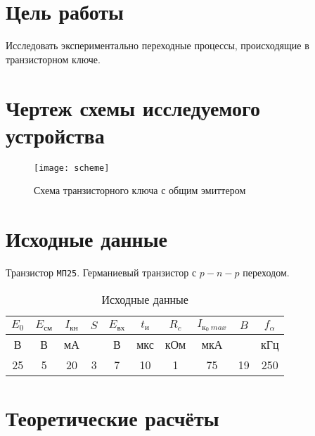 





\section{Цель работы}

Исследовать экспериментально переходные процессы, происходящие в транзисторном ключе.

\section{Чертеж схемы исследуемого устройства}

\begin{figure}[H]
\begin{center}
	\vspace{-0.5cm}
	\texttt{[image: scheme]}
	\caption{Схема транзисторного ключа с общим эмиттером}
	\vspace{-0.5cm}
\end{center}
\end{figure}

\section{Исходные данные}

Транзистор \verb+МП25+. Германиевый транзистор с $p-n-p$ переходом.

\begin{table}[H]
\begin{center}
	\caption{Исходные данные}
	\def\tabcolsep{12pt}
	\begin{tabular}{|c|c|c|c|c|c|c|c|c|c|}
		\hline
		$E_0$ &
		$E_\text{см}$ &
		$I_\text{кн}$ &
		$S$ &
		$E_\text{вх}$ &
		$t_\text{и}$ &
		$R_c$ &
		$I_{\text{к}_0\ max}$ &
		$B$ &
		$f_\alpha$ \\
		\hline
		В &
		В &
		мА &
		 &
		В &
		мкс &
		кОм &
		мкА &
		 &
		кГц \\
		\hline
		25 &
		5 &
		20 &
		3 &
		7 &
		10 &
		1 &
		75 &
		19 &
		250 \\
	    \hline	
	\end{tabular}
\end{center}
\end{table}

\section{Теоретические расчёты}


